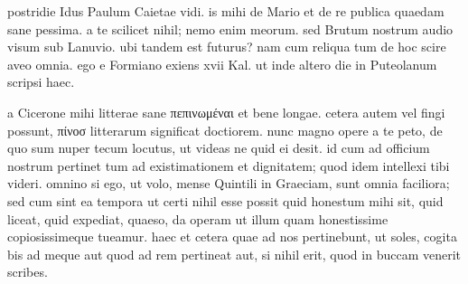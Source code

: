 


 postridie Idus Paulum Caietae vidi. is mihi de Mario et de re publica quaedam sane pessima. a te scilicet nihil; nemo enim meorum. sed Brutum nostrum audio visum sub Lanuvio. ubi tandem est futurus? nam cum reliqua tum de hoc scire aveo omnia. ego e Formiano exiens xvii Kal. ut inde altero die in Puteolanum scripsi haec.

 a Cicerone mihi litterae sane πεπινωμέναι et bene longae. cetera autem vel fingi possunt, πίνοσ litterarum significat doctiorem. nunc magno opere a te peto, de quo sum nuper tecum locutus, ut videas ne quid ei desit. id cum ad officium nostrum pertinet tum ad existimationem et dignitatem; quod idem intellexi tibi videri. omnino si ego, ut volo, mense Quintili in Graeciam, sunt omnia faciliora; sed cum sint ea tempora ut certi nihil esse possit quid honestum mihi sit, quid liceat, quid expediat, quaeso, da operam ut illum quam honestissime copiosissimeque tueamur. haec et cetera quae ad nos pertinebunt, ut soles, cogita bis ad meque aut quod ad rem pertineat aut, si nihil erit, quod in buccam venerit scribes.

